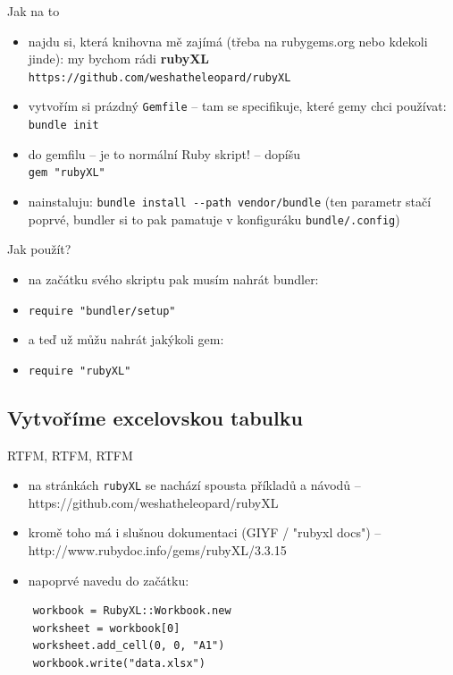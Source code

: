 \documentclass{beamer}
\begin{document}
\begin{frame}{Jak na to}
  \begin{itemize}
    \item najdu si, která knihovna mě zajímá (třeba na rubygems.org nebo kdekoli jinde): my bychom rádi \textbf{rubyXL} \texttt{https://github.com/weshatheleopard/rubyXL}
    \item vytvořím si prázdný \texttt{Gemfile} -- tam se specifikuje, které gemy chci používat: \texttt{bundle init}
    \item do gemfilu -- je to normální Ruby skript! -- dopíšu\\ \texttt{gem "rubyXL"}
    \item nainstaluju: \texttt{bundle install -{}-path vendor/bundle} (ten parametr stačí poprvé, bundler si to pak pamatuje v konfiguráku \texttt{bundle/.config})
  \end{itemize}
\end{frame}

\begin{frame}{Jak použít?}
  \begin{itemize}
    \item na začátku svého skriptu pak musím nahrát bundler:
    \item \texttt{require "bundler/setup"}
    \item a teď už můžu nahrát jakýkoli gem:
    \item \texttt{require "rubyXL"}
  \end{itemize}
\end{frame}

\subsection{Vytvoříme excelovskou tabulku}

\begin{frame}[fragile]{RTFM, RTFM, RTFM}
  \begin{itemize}
    \item na stránkách \texttt{rubyXL} se nachází spousta příkladů a návodů -- https://github.com/weshatheleopard/rubyXL
    \item kromě toho má i slušnou dokumentaci (GIYF / "rubyxl docs") -- http://www.rubydoc.info/gems/rubyXL/3.3.15
    \item napoprvé navedu do začátku:
  \end{itemize}
  {\scriptsize
  \begin{verbatim}
    workbook = RubyXL::Workbook.new
    worksheet = workbook[0]
    worksheet.add_cell(0, 0, "A1")
    workbook.write("data.xlsx")
  \end{verbatim}
  }
\end{frame}
\end{document}
